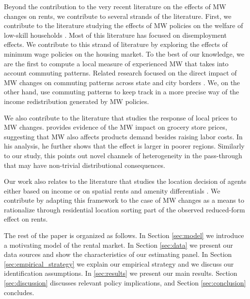 Beyond the contribution to the very recent literature on the effects of MW changes on 
rents, we contribute to several strands of the literature.
First, we contribute to the literature studying the effects of MW policies on the welfare 
of low-skill households \parencite[][among others]{DinardoEtAl1995, Lee1999, 
CardKrueger2000, Neumark2006, AutorEtAl2016, CegnizEtAl2019}.
Most of this literature has focused on disemployment effects. We contribute to this 
strand of literature by exploring the effects of minimum wage policies on the housing 
market.
To the best of our knowledge, we are the first to compute a local measure of experienced 
MW that takes into account commuting patterns.
Related research focused on the direct impact of MW changes on commuting patterns across 
state and city borders \parencite{Mckinnish2017, PerezPerez2018}.
We, on the other hand, use commuting patterns to keep track in a more precise way of the 
income redistribution generated by MW policies.

We also contribute to the literature that studies the response of local prices to MW 
changes. \textcite{Leung2018} provides evidence of the MW impact on grocery store prices, 
suggesting that MW also affects products demand besides raising labor costs. In his 
analysis, he further shows that the effect is larger in poorer regions. Similarly to our 
study, this points out novel channels of heterogeneity in the pass-through that may have 
non-trivial distributional consequences.

Our work also relates to the literature that studies the location decision of agents 
either based on income \parencite{Roback1982, Kennan2011, DesmetRossihansberg2013, 
PerezPerez2018, Monras2019} or on spatial rents and amenity differentials 
\parencite{Diamond2016, AlmagroDominguez2019, Couture2019}.
We contribute by adapting this framework to the case of MW changes as a means to 
rationalize through residential location sorting part of the observed reduced-form effect 
on rents.

The rest of the paper is organized as follows.
In Section \ref{sec:model} we introduce a motivating model of the rental market.
In Section \ref{sec:data} we present our data sources and show the characteristics 
of our estimating panel.
In Section \ref{sec:empirical_strategy} we explain our empirical strategy and
we discuss our identification assumptions.
In \ref{sec:results} we present our main results.
Section \ref{sec:discussion} discusses relevant policy implications, and
Section \ref{sec:conclusion} concludes.
